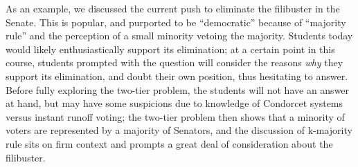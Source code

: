 As an example, we discussed the current push to eliminate the filibuster in the Senate.  This is popular, and purported to be ``democratic'' because of ``majority rule'' and the perception of a small minority vetoing the majority.  Students today would likely enthusiastically support its elimination; at a certain point in this course, students prompted with the question will consider the reasons \textit{why} they support its elimination, and doubt their own position, thus hesitating to answer.   Before fully exploring the two-tier problem, the students will not have an answer at hand, but may have some suspicions due to knowledge of Condorcet systems versus instant runoff voting; the two-tier problem then shows that a minority of voters are represented by a majority of Senators, and the discussion of k-majority rule sits on firm context and prompts a great deal of consideration about the filibuster.
